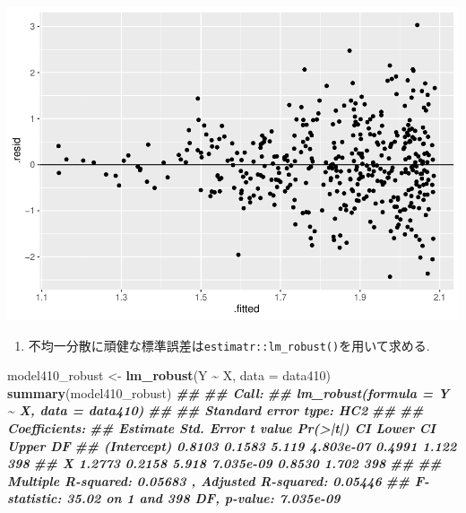 \documentclass[
]{book}
\newenvironment{Shaded}{\begin{snugshade}}{\end{snugshade}}
\newcommand{\AttributeTok}[1]{\textcolor[rgb]{0.13,0.29,0.53}{#1}}
\newcommand{\DocumentationTok}[1]{\textcolor[rgb]{0.56,0.35,0.01}{\textbf{\textit{#1}}}}
\newcommand{\FunctionTok}[1]{\textcolor[rgb]{0.13,0.29,0.53}{\textbf{#1}}}
\newcommand{\NormalTok}[1]{#1}
\newcommand{\OtherTok}[1]{\textcolor[rgb]{0.56,0.35,0.01}{#1}}
\newcommand{\SpecialCharTok}[1]{\textcolor[rgb]{0.81,0.36,0.00}{\textbf{#1}}}
\providecommand{\tightlist}{%
  \setlength{\itemsep}{0pt}\setlength{\parskip}{0pt}}
\begin{document}
\includegraphics{_main_files/figure-latex/unnamed-chunk-19-1.pdf}

\begin{enumerate}
\def\labelenumi{(\arabic{enumi})}
\setcounter{enumi}{2}
\tightlist
\item
  不均一分散に頑健な標準誤差は\texttt{estimatr::lm\_robust()}を用いて求める.
\end{enumerate}

\begin{Shaded}
\begin{Highlighting}[]
\NormalTok{model410\_robust }\OtherTok{\textless{}{-}} \FunctionTok{lm\_robust}\NormalTok{(Y }\SpecialCharTok{\textasciitilde{}}\NormalTok{ X, }\AttributeTok{data =}\NormalTok{ data410)}
\FunctionTok{summary}\NormalTok{(model410\_robust)}
\DocumentationTok{\#\# }
\DocumentationTok{\#\# Call:}
\DocumentationTok{\#\# lm\_robust(formula = Y \textasciitilde{} X, data = data410)}
\DocumentationTok{\#\# }
\DocumentationTok{\#\# Standard error type:  HC2 }
\DocumentationTok{\#\# }
\DocumentationTok{\#\# Coefficients:}
\DocumentationTok{\#\#             Estimate Std. Error t value  Pr(\textgreater{}|t|) CI Lower CI Upper  DF}
\DocumentationTok{\#\# (Intercept)   0.8103     0.1583   5.119 4.803e{-}07   0.4991    1.122 398}
\DocumentationTok{\#\# X             1.2773     0.2158   5.918 7.035e{-}09   0.8530    1.702 398}
\DocumentationTok{\#\# }
\DocumentationTok{\#\# Multiple R{-}squared:  0.05683 ,   Adjusted R{-}squared:  0.05446 }
\DocumentationTok{\#\# F{-}statistic: 35.02 on 1 and 398 DF,  p{-}value: 7.035e{-}09}
\end{Highlighting}
\end{Shaded}
\end{document}

